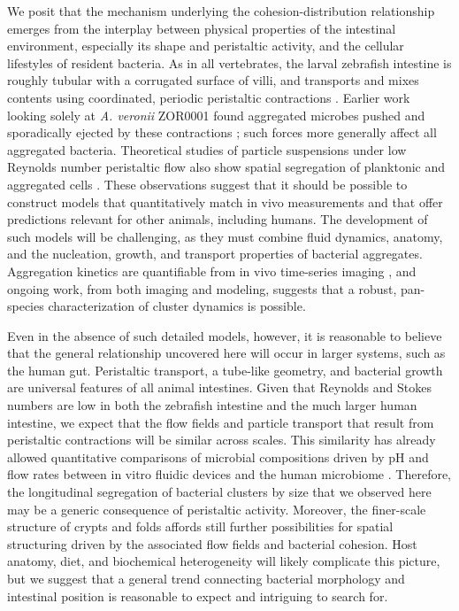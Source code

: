 We posit that the mechanism underlying the cohesion-distribution relationship emerges from the interplay between physical properties of the intestinal environment, especially its shape and peristaltic activity, and the cellular lifestyles of resident bacteria. As in all vertebrates, the larval zebrafish intestine is roughly tubular with a corrugated surface of villi, and transports and mixes contents using coordinated, periodic peristaltic contractions \cite{Wallace2005}.  Earlier work looking solely at \textit{A. veronii} ZOR0001 found aggregated microbes pushed and sporadically ejected by these contractions \cite{Wiles2016}; such forces more generally affect all aggregated bacteria. Theoretical studies of particle suspensions under low Reynolds number peristaltic flow also show spatial segregation of planktonic and aggregated cells \cite{Jimenez-Lozano2009}. These observations suggest that it should be possible to construct models that quantitatively match in vivo measurements and that offer predictions relevant for other animals, including humans. The development of such models will be challenging, as they must combine fluid dynamics, anatomy, and the nucleation, growth, and transport properties of bacterial aggregates. Aggregation kinetics are quantifiable from in vivo time-series imaging \cite{Jemielita2014}, and ongoing work, from both imaging and modeling, suggests that a robust, pan-species characterization of cluster dynamics is possible.	

Even in the absence of such detailed models, however, it is reasonable to believe that the general relationship uncovered here will occur in larger systems, such as the human gut. Peristaltic transport, a tube-like geometry, and bacterial growth are universal features of all animal intestines. Given that Reynolds and Stokes numbers are low in both the zebrafish intestine and the much larger human intestine, we expect that the flow fields and particle transport that result from peristaltic contractions will be similar across scales. This similarity has already allowed quantitative comparisons of microbial compositions driven by pH and flow rates between in vitro fluidic devices and the human microbiome \cite{Cremer2016}.  Therefore, the longitudinal segregation of bacterial clusters by size that we observed here may be a generic consequence of peristaltic activity. Moreover, the finer-scale structure of crypts and folds affords still further possibilities for spatial structuring driven by the associated flow fields and bacterial cohesion. Host anatomy, diet, and biochemical heterogeneity will likely complicate this picture, but we suggest that a general trend connecting bacterial morphology and intestinal position is reasonable to expect and intriguing to search for. 	


